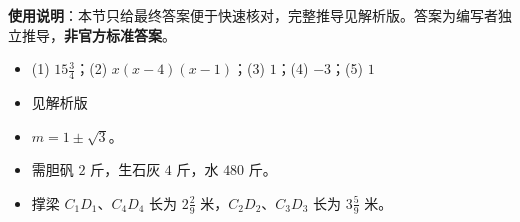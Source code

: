 
\begin{gknotice}
\textbf{使用说明}：本节只给最终答案便于快速核对，完整推导见解析版。答案为编写者独立推导，\textbf{非官方标准答案}。
\end{gknotice}

\begin{itemize}[leftmargin=2.6em]
  \item[\textbf{1.}] (1) $15\frac{3}{4}$；(2) $x(x-4)(x-1)$；(3) $1$；(4) $-3$；(5) $1$
  \item[\textbf{2.}] 见解析版
  \item[\textbf{3.}] $m=1\pm\sqrt{3}$。
  \item[\textbf{4.}] 需胆矾 $2$ 斤，生石灰 $4$ 斤，水 $480$ 斤。
  \item[\textbf{5.}] 撑梁 $C_1D_1$、$C_4D_4$ 长为 $2\frac{2}{9}$ 米，$C_2D_2$、$C_3D_3$ 长为 $3\frac{5}{9}$ 米。
\end{itemize}
